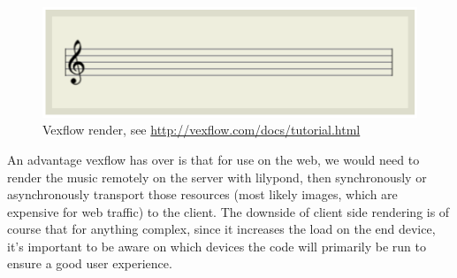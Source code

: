 \begin{figure}[h!]
  \includegraphics[width=\linewidth]{gfx/vexflow.png}
  \centering
  \caption{Vexflow render, see \url{http://vexflow.com/docs/tutorial.html}}
  \label{fig:vexflow-output}
\end{figure}

An advantage vexflow has over  is that for use on the web, we would need to render the music remotely on the server with lilypond, then synchronously or asynchronously transport those resources (most likely images, which are expensive for web traffic) to the client. The downside of client side rendering is of course that for anything complex, since it increases the load on the end device, it's important to be aware on which devices the code will primarily be run to ensure a good user experience.


